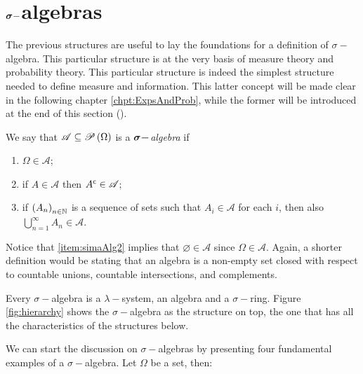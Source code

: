 \section{$\boldsymbol{\sigma}-$algebras}
The previous structures are useful to lay the foundations for a definition of $\sigma-$algebra. This particular structure is at the very basis of measure theory and probability theory. This particular structure is indeed the simplest structure needed to define measure and information. This latter concept will be made clear in the following chapter \ref{chpt:ExpsAndProb}, while the former will be introduced at the end of this section ().
\begin{definition}\label{def:sigmaAlgebra}
    We say that $\mathscr{A}\subseteq\mathscr{P}\left( \Omega \right)$ is a  \emph{$\boldsymbol{\sigma-}$algebra} if 
    \begin{enumerate}[label=(\roman*)]
        \item\label{item:simaAlg1} $\Omega\in\mathscr{A}$;
        \item\label{item:simaAlg2} if $A\in\mathscr{A}$ then ${A}^{\mathsf{c}}\in\mathscr{A}$;
        \item\label{item:simaAlg3} if $\left( A_{n} \right)_{n\in\mathbb{ N}}$ is a sequence of sets such that $A_{i}\in\mathscr{A}$ for each $i$, then also $\bigcup_{n=1}^{\infty}A_{n}\in\mathscr{A}$. 
    \end{enumerate}
    Notice that \ref{item:simaAlg2} implies that $\varnothing\in\mathscr{A}$ since $\Omega\in\mathscr{A}$. Again, a shorter definition would be stating that an algebra is a non-empty set closed with respect to countable unions, countable intersections, and complements.
\end{definition}
\begin{theorem}
    Every $\sigma-$algebra is a $\lambda-$system, an algebra and a $\sigma-$ring.
    Figure \ref{fig:hierarchy} shows the $\sigma-$algebra as the structure on top, the one that has all the characteristics of the structures below.
\end{theorem}
We can start the discussion on $\sigma-$algebras by presenting four fundamental examples of a $\sigma-$algebra. Let $\Omega$ be a set, then:
